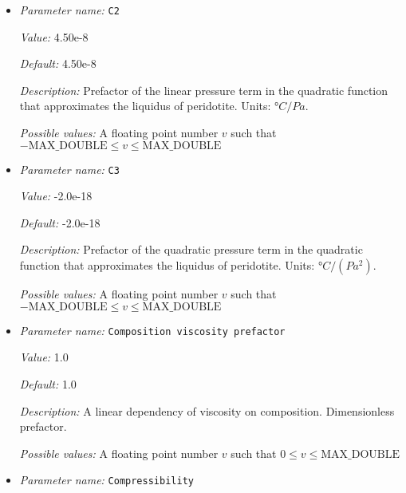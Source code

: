 \begin{itemize}
{\it Possible values:} A floating point number $v$ such that $-\text{MAX\_DOUBLE} \leq v \leq \text{MAX\_DOUBLE}$
\item {\it Parameter name:} {\tt C2}
\label{parameters:Material model/Latent heat melt/C2}
\label{parameters:Material_20model/Latent_20heat_20melt/C2}


{\it Value:} 4.50e-8


{\it Default:} 4.50e-8


{\it Description:} Prefactor of the linear pressure term in the quadratic function that approximates the liquidus of peridotite. Units: $°C/Pa$.


{\it Possible values:} A floating point number $v$ such that $-\text{MAX\_DOUBLE} \leq v \leq \text{MAX\_DOUBLE}$
\item {\it Parameter name:} {\tt C3}
\label{parameters:Material model/Latent heat melt/C3}
\label{parameters:Material_20model/Latent_20heat_20melt/C3}


{\it Value:} -2.0e-18


{\it Default:} -2.0e-18


{\it Description:} Prefactor of the quadratic pressure term in the quadratic function that approximates the liquidus of peridotite. Units: $°C/(Pa^2)$.


{\it Possible values:} A floating point number $v$ such that $-\text{MAX\_DOUBLE} \leq v \leq \text{MAX\_DOUBLE}$
\item {\it Parameter name:} {\tt Composition viscosity prefactor}
\label{parameters:Material model/Latent heat melt/Composition viscosity prefactor}
\label{parameters:Material_20model/Latent_20heat_20melt/Composition_20viscosity_20prefactor}


{\it Value:} 1.0


{\it Default:} 1.0


{\it Description:} A linear dependency of viscosity on composition. Dimensionless prefactor.


{\it Possible values:} A floating point number $v$ such that $0 \leq v \leq \text{MAX\_DOUBLE}$
\item {\it Parameter name:} {\tt Compressibility}
\label{parameters:Material model/Latent heat melt/Compressibility}
\label{parameters:Material_20model/Latent_20heat_20melt/Compressibility}



\end{itemize}

